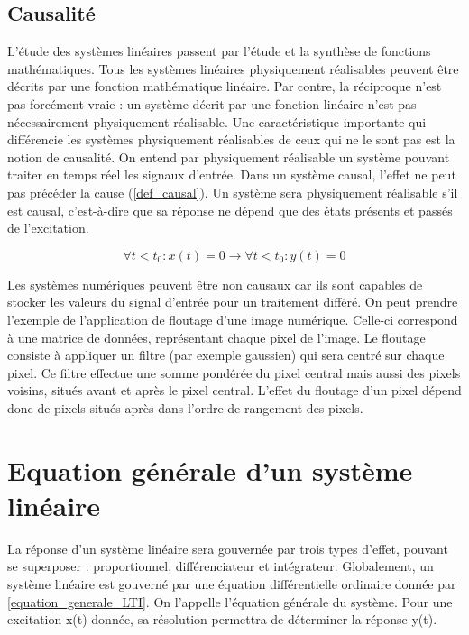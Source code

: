 	\subsection{Causalité}
	L'étude des systèmes linéaires passent par l'étude et la synthèse de fonctions mathématiques. Tous les systèmes linéaires physiquement réalisables peuvent être décrits par une fonction mathématique linéaire. Par contre, la réciproque n'est pas forcément vraie : un système décrit par une fonction linéaire n'est pas nécessairement physiquement réalisable. Une caractéristique importante qui différencie les systèmes physiquement réalisables de ceux qui ne le sont pas est la notion de causalité. On entend par physiquement réalisable un système pouvant traiter en temps réel les signaux d'entrée.
	Dans un système causal, l'effet ne peut pas précéder la cause (\ref{def_causal}). Un système sera physiquement réalisable s'il est causal, c'est-à-dire que sa réponse ne dépend que des états présents et passés de l'excitation.
	
	\begin{equation}\label{def_causal}
	\forall t < t_{0} : x(t) = 0 \rightarrow \forall t < t_{0} : y(t) = 0
	\end{equation}
	
	Les systèmes numériques peuvent être non causaux car ils sont capables de stocker les valeurs du signal d'entrée pour un traitement différé. On peut prendre l'exemple de l'application de floutage d'une image numérique. Celle-ci correspond à une matrice de données, représentant chaque pixel de l'image. Le floutage consiste à appliquer un filtre (par exemple gaussien) qui sera centré sur chaque pixel. Ce filtre effectue une somme pondérée du pixel central mais aussi des pixels voisins, situés avant et après le pixel central. L'effet du floutage d'un pixel dépend donc de pixels situés après dans l'ordre de rangement des pixels. 

	
	
	\section{Equation générale d'un système linéaire}
	La réponse d'un système linéaire sera gouvernée par trois types d'effet, pouvant se superposer : proportionnel, différenciateur et intégrateur. Globalement, un système linéaire est gouverné par une équation différentielle ordinaire donnée par \ref{equation_generale_LTI}. On l'appelle l'équation générale du système. Pour une excitation x(t) donnée, sa résolution permettra de déterminer la réponse y(t).
	
